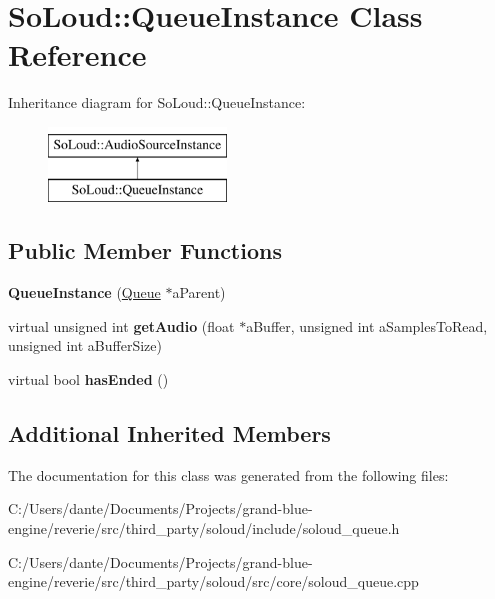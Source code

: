 \hypertarget{class_so_loud_1_1_queue_instance}{}\section{So\+Loud\+::Queue\+Instance Class Reference}
\label{class_so_loud_1_1_queue_instance}
Inheritance diagram for So\+Loud\+::Queue\+Instance\+:\begin{figure}[H]
\begin{center}
\leavevmode
\includegraphics[height=2.000000cm]{class_so_loud_1_1_queue_instance}
\end{center}
\end{figure}
\subsection*{Public Member Functions}
\begin{DoxyCompactItemize}
\item 
\mbox{\label{class_so_loud_1_1_queue_instance_ab1bf940853f7df588659648e687aa0ef}} 
{\bfseries Queue\+Instance} (\mbox{\hyperlink{class_so_loud_1_1_queue}{Queue}} $\ast$a\+Parent)
\item 
\mbox{\label{class_so_loud_1_1_queue_instance_ab6e62c98c9eba17677be566dc45111ad}} 
virtual unsigned int {\bfseries get\+Audio} (float $\ast$a\+Buffer, unsigned int a\+Samples\+To\+Read, unsigned int a\+Buffer\+Size)
\item 
\mbox{\label{class_so_loud_1_1_queue_instance_aacb5bc1839eb1738101ddf95baefc58d}} 
virtual bool {\bfseries has\+Ended} ()
\end{DoxyCompactItemize}
\subsection*{Additional Inherited Members}


The documentation for this class was generated from the following files\+:\begin{DoxyCompactItemize}
\item 
C\+:/\+Users/dante/\+Documents/\+Projects/grand-\/blue-\/engine/reverie/src/third\+\_\+party/soloud/include/soloud\+\_\+queue.\+h\item 
C\+:/\+Users/dante/\+Documents/\+Projects/grand-\/blue-\/engine/reverie/src/third\+\_\+party/soloud/src/core/soloud\+\_\+queue.\+cpp\end{DoxyCompactItemize}
